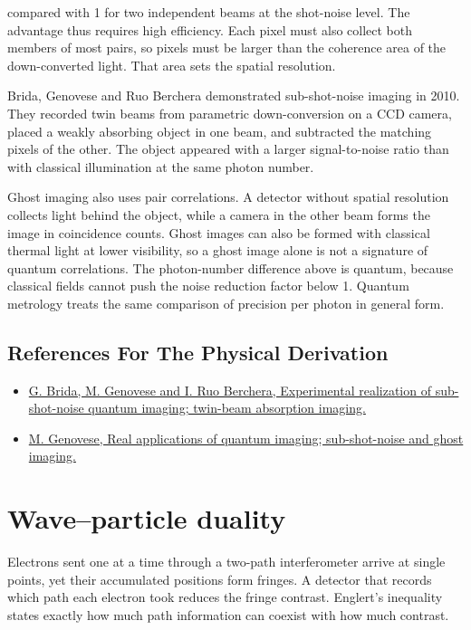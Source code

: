 \documentclass[11pt,oneside]{book}
\begin{document}
compared with 1 for two independent beams at the shot-noise level. The advantage thus requires high efficiency. Each pixel must also collect both members of most pairs, so pixels must be larger than the coherence area of the down-converted light. That area sets the spatial resolution.

Brida, Genovese and Ruo Berchera demonstrated sub-shot-noise imaging in 2010. They recorded twin beams from parametric down-conversion on a CCD camera, placed a weakly absorbing object in one beam, and subtracted the matching pixels of the other. The object appeared with a larger signal-to-noise ratio than with classical illumination at the same photon number.

Ghost imaging also uses pair correlations. A detector without spatial resolution collects light behind the object, while a camera in the other beam forms the image in coincidence counts. Ghost images can also be formed with classical thermal light at lower visibility, so a ghost image alone is not a signature of quantum correlations. The photon-number difference above is quantum, because classical fields cannot push the noise reduction factor below 1. Quantum metrology treats the same comparison of precision per photon in general form.

\subsection*{References For The Physical Derivation}
\begin{itemize}
\item \href{https://arxiv.org/abs/1004.1274}{G. Brida, M. Genovese and I. Ruo Berchera, Experimental realization of sub-shot-noise quantum imaging; twin-beam absorption imaging.}
\item \href{https://arxiv.org/abs/1601.06066}{M. Genovese, Real applications of quantum imaging; sub-shot-noise and ghost imaging.}
\end{itemize}





\clearpage

\section{Wave–particle duality}

\label{topic:wave-particle-duality}

Electrons sent one at a time through a two-path interferometer arrive at single points, yet their accumulated positions form fringes. A detector that records which path each electron took reduces the fringe contrast. Englert's inequality states exactly how much path information can coexist with how much contrast.
\end{document}
